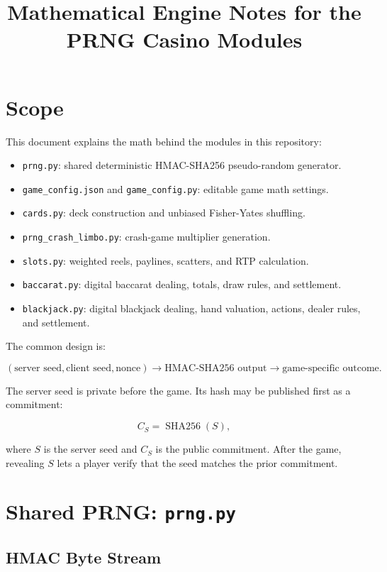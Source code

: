 \documentclass[11pt]{article}
\title{Mathematical Engine Notes for the PRNG Casino Modules}
\author{}
\date{}
\begin{document}
\maketitle

\section{Scope}

This document explains the math behind the modules in this repository:

\begin{itemize}
    \item \texttt{prng.py}: shared deterministic HMAC-SHA256 pseudo-random generator.
    \item \texttt{game\_config.json} and \texttt{game\_config.py}: editable game math settings.
    \item \texttt{cards.py}: deck construction and unbiased Fisher-Yates shuffling.
    \item \texttt{prng\_crash\_limbo.py}: crash-game multiplier generation.
    \item \texttt{slots.py}: weighted reels, paylines, scatters, and RTP calculation.
    \item \texttt{baccarat.py}: digital baccarat dealing, totals, draw rules, and settlement.
    \item \texttt{blackjack.py}: digital blackjack dealing, hand valuation, actions, dealer rules, and settlement.
\end{itemize}

The common design is:

\[
(\text{server seed}, \text{client seed}, \text{nonce}) \longrightarrow
\text{HMAC-SHA256 output} \longrightarrow \text{game-specific outcome}.
\]

The server seed is private before the game. Its hash may be published first as a commitment:

\[
C_S = \operatorname{SHA256}(S),
\]

where \(S\) is the server seed and \(C_S\) is the public commitment. After the game, revealing \(S\) lets a player verify that the seed matches the prior commitment.

\section{Shared PRNG: \texttt{prng.py}}

\subsection{HMAC Byte Stream}
\end{document}
